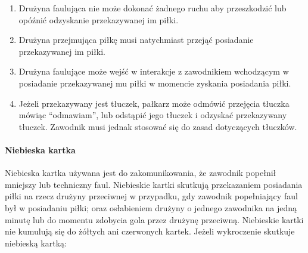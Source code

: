 \documentclass[12pt]{article}
\begin{document}
\begin{enumerate}
  \begin{enumerate}
  \item
        Drużyna faulująca nie może dokonać żadnego ruchu aby przeszkodzić
    lub opóźnić odzyskanie przekazywanej im piłki.
      \item
        Drużyna przejmująca piłkę musi natychmiast przejąć posiadanie
    przekazywanej im piłki.
      \item
        Drużyna faulujące może wejść w interakcje z zawodnikiem wchodzącym w
    posiadanie przekazywanej mu piłki w momencie zyskania posiadania
    piłki.
      \item
        Jeżeli przekazywany jest tłuczek, pałkarz może odmówić przejęcia
    tłuczka mówiąc ``odmawiam'', lub odstąpić jego tłuczek i odzyskać
    przekazywany tłuczek. Zawodnik musi jednak stosować się do zasad
    dotyczących tłuczków.
      \end{enumerate}
\end{enumerate}

\paragraph{Niebieska kartka}
Niebieska kartka używana jest do
zakomunikowania, że zawodnik popełnił mniejszy lub techniczny faul.
Niebieskie kartki skutkują przekazaniem posiadania piłki na rzecz
drużyny przeciwnej w przypadku, gdy zawodnik popełniający faul był w
posiadaniu piłki; oraz osłabieniem drużyny o jednego zawodnika na jedną
minutę lub do momentu zdobycia gola przez drużynę przeciwną. Niebieskie
kartki nie kumulują się do żółtych ani czerwonych kartek. Jeżeli
wykroczenie skutkuje niebieską kartką:
\end{document}
